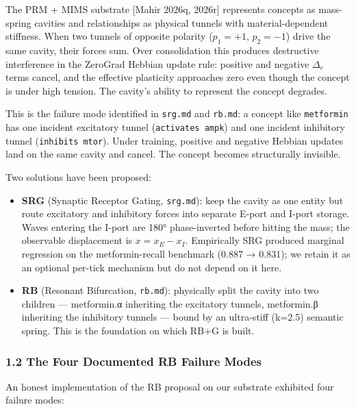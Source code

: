 \documentclass[
  11pt,
  a4paper,
]{article}
\providecommand{\tightlist}{%
  \setlength{\itemsep}{0pt}\setlength{\parskip}{0pt}}
\begin{document}
The PRM + MIMS substrate {[}Mahir 2026q, 2026r{]} represents concepts as
mass-spring cavities and relationships as physical tunnels with
material-dependent stiffness. When two tunnels of opposite polarity
(\(p_1 = +1\), \(p_2 = -1\)) drive the same cavity, their forces sum.
Over consolidation this produces destructive interference in the
ZeroGrad Hebbian update rule: positive and negative \(\Delta_e\) terms
cancel, and the effective plasticity approaches zero even though the
concept is under high tension. The cavity's ability to represent the
concept degrades.

This is the failure mode identified in \texttt{srg.md} and
\texttt{rb.md}: a concept like \texttt{metformin} has one incident
excitatory tunnel (\texttt{activates\ ampk}) and one incident inhibitory
tunnel (\texttt{inhibits\ mtor}). Under training, positive and negative
Hebbian updates land on the same cavity and cancel. The concept becomes
structurally invisible.

Two solutions have been proposed:

\begin{itemize}
\tightlist
\item
  \textbf{SRG} (Synaptic Receptor Gating, \texttt{srg.md}): keep the
  cavity as one entity but route excitatory and inhibitory forces into
  separate E-port and I-port storage. Waves entering the I-port are 180°
  phase-inverted before hitting the mass; the observable displacement is
  \(x = x_E - x_I\). Empirically SRG produced marginal regression on the
  metformin-recall benchmark (0.887 → 0.831); we retain it as an
  optional per-tick mechanism but do not depend on it here.
\item
  \textbf{RB} (Resonant Bifurcation, \texttt{rb.md}): physically split
  the cavity into two children --- metformin.α inheriting the excitatory
  tunnels, metformin.β inheriting the inhibitory tunnels --- bound by an
  ultra-stiff (k=2.5) semantic spring. This is the foundation on which
  RB+G is built.
\end{itemize}

\subsubsection{1.2 The Four Documented RB Failure
Modes}\label{the-four-documented-rb-failure-modes}

An honest implementation of the RB proposal on our substrate exhibited
four failure modes:
\end{document}
